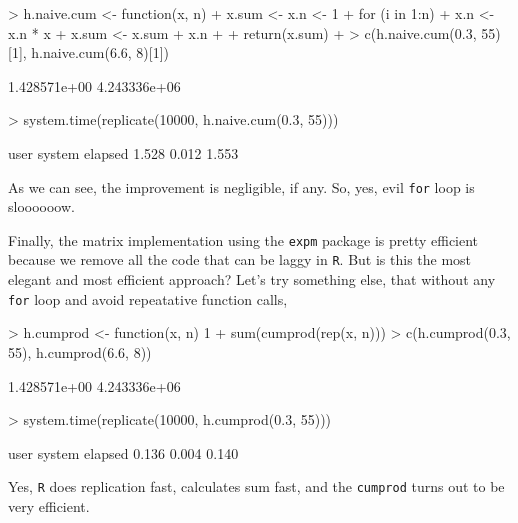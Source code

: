 \documentclass{article}
\begin{document}
\begin{Schunk}
\begin{Sinput}
> h.naive.cum <- function(x, n) {
+     x.sum <- x.n <- 1
+     for (i in 1:n) {
+         x.n <- x.n * x
+         x.sum <- x.sum + x.n
+     }
+     return(x.sum)
+ }
> c(h.naive.cum(0.3, 55)[1], h.naive.cum(6.6, 8)[1])
\end{Sinput}
\begin{Soutput}
[1] 1.428571e+00 4.243336e+06
\end{Soutput}
\begin{Sinput}
> system.time(replicate(10000, h.naive.cum(0.3, 55)))
\end{Sinput}
\begin{Soutput}
   user  system elapsed 
  1.528   0.012   1.553 
\end{Soutput}
\end{Schunk}

As we can see, the improvement is negligible, if any. So, yes, evil \verb=for= loop is sloooooow. 

Finally, the matrix implementation using the \verb=expm= package is pretty efficient because we remove all the code that can be laggy in \verb=R=. But is this the most elegant and most efficient approach? Let's try something else, that without any \verb=for= loop and avoid repeatative function calls,
\begin{Schunk}
\begin{Sinput}
> h.cumprod <- function(x, n) 1 + sum(cumprod(rep(x, n)))
> c(h.cumprod(0.3, 55), h.cumprod(6.6, 8))
\end{Sinput}
\begin{Soutput}
[1] 1.428571e+00 4.243336e+06
\end{Soutput}
\begin{Sinput}
> system.time(replicate(10000, h.cumprod(0.3, 55)))
\end{Sinput}
\begin{Soutput}
   user  system elapsed 
  0.136   0.004   0.140 
\end{Soutput}
\end{Schunk}
Yes, \verb=R= does replication fast, calculates sum fast, and the \verb=cumprod= turns out to be very efficient.
\end{document}
